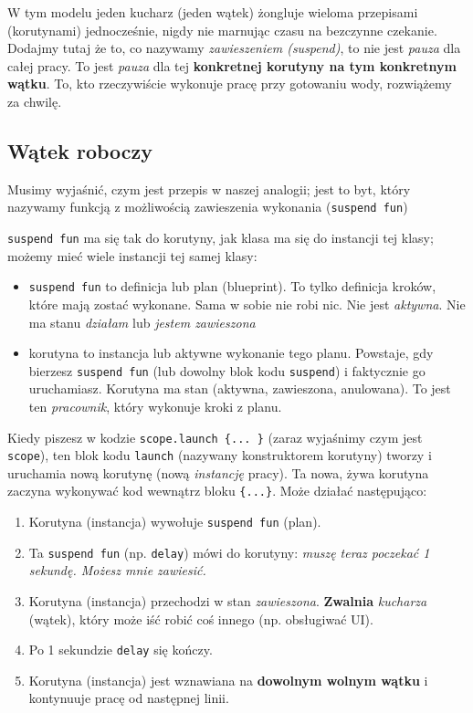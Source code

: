 W tym modelu jeden kucharz (jeden wątek) żongluje wieloma przepisami (korutynami) jednocześnie, nigdy nie marnując czasu na bezczynne czekanie. Dodajmy tutaj że to, co nazywamy \textit{zawieszeniem (suspend)}, to nie jest \textit{pauza} dla całej pracy. To jest \textit{pauza} dla tej \textbf{konkretnej korutyny na tym konkretnym wątku}. To, kto rzeczywiście wykonuje pracę przy gotowaniu wody, rozwiążemy za chwilę.

\subsection{Wątek roboczy}

Musimy wyjaśnić, czym jest przepis w naszej analogii; jest to byt, który nazywamy funkcją z możliwością zawieszenia wykonania (\texttt{suspend fun})

\texttt{suspend fun} ma się tak do korutyny, jak klasa ma się do instancji tej klasy; możemy mieć wiele instancji tej samej klasy:
\begin{itemize}
\item \texttt{suspend fun} to definicja lub plan (blueprint). To tylko definicja kroków, które mają zostać wykonane. Sama w sobie nie robi nic. Nie jest \textit{aktywna}. Nie ma stanu \textit{działam} lub \textit{jestem zawieszona}
\item korutyna to instancja lub aktywne wykonanie tego planu. Powstaje, gdy bierzesz \texttt{suspend fun} (lub dowolny blok kodu \texttt{suspend}) i faktycznie go uruchamiasz. Korutyna ma stan (aktywna, zawieszona, anulowana). To jest ten \textit{pracownik}, który wykonuje kroki z planu.
\end{itemize}

Kiedy piszesz w kodzie \texttt{scope.launch \{... \}} (zaraz wyjaśnimy czym jest \texttt{scope}), ten blok kodu \texttt{launch} (nazywany konstruktorem korutyny) tworzy i uruchamia nową korutynę (nową \textit{instancję} pracy). Ta nowa, żywa korutyna zaczyna wykonywać kod wewnątrz bloku \texttt{\{...\}}. Może działać następująco:
\begin{enumerate}
\item Korutyna (instancja) wywołuje \texttt{suspend fun} (plan).
\item Ta \texttt{suspend fun} (np. \texttt{delay}) mówi do korutyny: \textit{muszę teraz poczekać 1 sekundę. Możesz mnie zawiesić.}
\item Korutyna (instancja) przechodzi w stan \textit{zawieszona}. \textbf{Zwalnia} \textit{kucharza} (wątek), który może iść robić coś innego (np. obsługiwać UI).
\item Po 1 sekundzie \texttt{delay} się kończy.
\item Korutyna (instancja) jest wznawiana na \textbf{dowolnym wolnym wątku} i kontynuuje pracę od następnej linii.
\end{enumerate}

